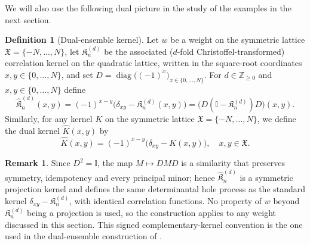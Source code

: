 \documentclass[reqno,11pt]{amsart}
\newcommand{\Khat}{\widehat{\mathfrak{K}}}
\newcommand{\II}{\mathbb{I}}
\newcommand{\ZZ}{\mathbb{Z}}
\theoremstyle{plain}
\theoremstyle{definition}
\newtheorem{dfn}[thm]{Definition}
\newtheorem{remark}[thm]{Remark}
\numberwithin{equation}{section}
\begin{document}
We will also use the following dual picture in the study of the examples in the next section.
\begin{dfn}[Dual-ensemble kernel]\label{def:dual}
Let $w$ be a weight on the symmetric lattice $\mathfrak{X}=\{-N,...,N\}$, let $\mathfrak{K}^{(d)}_{n}$ be the associated ($d$-fold Christoffel-transformed) correlation kernel on the quadratic lattice, written in the square-root
coordinates $x,y\in\{0,\dots,N\}$, and set
$D=\operatorname{diag}\bigl((-1)^{x}\bigr)_{x\in\{0,\dots,N\}}$. 
For $d\in\ZZ_{\ge0}$ 
and $x,y\in\{0,\dots,N\}$ 
define
$$
\Khat^{(d)}_{n}(x,y) = (-1)^{x-y}\bigl(\delta_{xy}-\mathfrak{K}^{(d)}_{n}(x,y)\bigr)
=\bigl(D(\II-\mathfrak{K}^{(d)}_{n})D\bigr)(x,y).
$$
Similarly, for any kernel $K$ on the symmetric lattice 
$\mathfrak X=\{-N,\ldots,N\}$, we define the dual kernel $\widehat{K}(x,y)$ by
$$
\widehat{K}(x,y) = 
  (-1)^{x-y}\bigl(\delta_{xy}-K(x,y)\bigr),
\quad x,y\in \mathfrak X.
$$
\end{dfn}

\begin{remark}\label{rem:dual}
Since $D^{2}=\II$, the map $M\mapsto DMD$ is a similarity that preserves symmetry, idempotency and every principal minor; hence $\Khat^{(d)}_{n}$ is a symmetric projection kernel and defines the same determinantal hole process as the standard kernel
$\delta_{xy}-\mathfrak{K}^{(d)}_{n}$, with identical correlation functions. No property of $w$ beyond $\mathfrak{K}^{(d)}_{n}$ being a projection is used, so the construction applies to any weight discussed in this section. 
This signed complementary-kernel convention is the one used in the dual-ensemble construction of
\cite[Propositions~7.2 and~7.3]{baik2007discrete}.
\end{remark}
\end{document}
